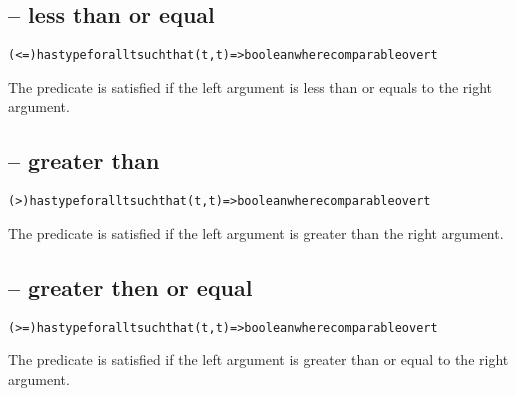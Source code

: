 \subsection{\q{<=} -- less than or equal}
\begin{alltt}
(<=) has type for all t such that (t,t)=>boolean where comparable over t
\end{alltt}

The \q{<=} predicate is satisfied if the left argument is less than or equals to the right argument.

\subsection{\q{>} -- greater than}
\begin{alltt}
(>) has type for all t such that (t,t)=>boolean where comparable over t
\end{alltt}

The \q{>} predicate is satisfied if the left argument is greater than the right argument.

\subsection{\q{>=} -- greater then or equal}
\begin{alltt}
(>=) has type for all t such that (t,t)=>boolean where comparable over t
\end{alltt}

The \q{>=} predicate is satisfied if the left argument is greater than or equal to the right argument.
